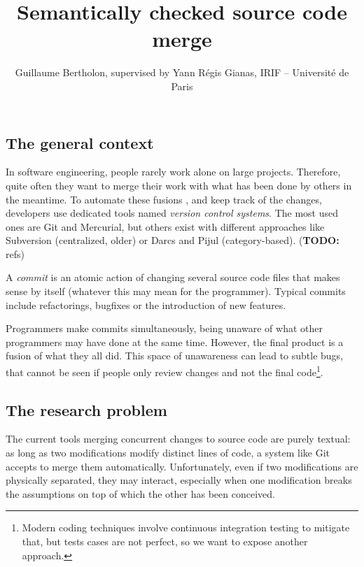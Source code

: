 \documentclass[a4paper,11pt]{article}
\title{Semantically checked source code merge}
\author{Guillaume Bertholon, supervised by Yann Régis Gianas, IRIF -- Université de Paris}
\newcommand\todo[1]{{\color{teal}(\textbf{TODO:} #1)}}
\begin{document}
\maketitle

\subsection*{The general context}


In software engineering, people rarely work alone on large
projects. Therefore, quite often they want to merge their work with
what has been done by others in the meantime.
%
To automate these fusions , and keep track of the changes, developers use dedicated tools named \textit{version control systems}. The most used ones are Git and Mercurial, but others exist with different approaches like Subversion (centralized, older) or Darcs and Pijul (category-based). \todo{refs}

A \textit{commit} is an atomic action of changing several source code
files that makes sense by itself (whatever this may mean for the
programmer). Typical commits include refactorings, bugfixes or the
introduction of new features.

Programmers make commits simultaneously, being unaware of what other
programmers may have done at the same time. However, the final product
is a fusion of what they all did. This space of unawareness can lead
to subtle bugs, that cannot be seen if people only review changes and
not the final code\footnote{Modern coding techniques involve
  continuous integration testing to mitigate that, but tests cases are
  not perfect, so we want to expose another approach.}.

\subsection*{The research problem}


The current tools merging concurrent changes to source code are
purely textual: as long as two modifications modify distinct lines of
code, a system like Git accepts to merge them
automatically. Unfortunately, even if two modifications are physically
separated, they may interact, especially when one modification breaks
the assumptions on top of which the other has been conceived.
\end{document}
